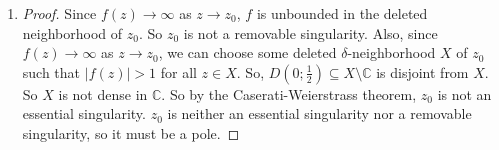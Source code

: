 \documentclass[11pt, letterpaper]{article}
\begin{document}
\begin{enumerate}
\begin{proof}
    Since $\ln z$ is analytic on this domain, $f(z)$ is analytic on this domain. Note that when $z \in \mathbb R$, the second factor is $1$, so $f(x) = x^x$ is real-valued on $\mathbb R$. We have

    $$
    f(i) = \exp(i \ln 1 + i^2 \pi/2) = \exp(-\pi/2) = \frac{1}{e^{\pi/2}}
    $$

    and

    $$
    f(-i) = \exp(-i \ln 1 + i^2 \pi/2) = \exp(-\pi/2) = \frac{1}{e^{\pi/2}}
    $$
  \end{proof}

  \item \begin{proof}
    Since $f(z) \to \infty$ as $z \to z_0$, $f$ is unbounded in the deleted neighborhood of $z_0$. So $z_0$ is not a removable singularity. Also, since $f(z) \to \infty$ as $z \to z_0$, we can choose some deleted $\delta$-neighborhood $X$ of $z_0$ such that $\vert f(z) \vert > 1$ for all $z \in X$. So, $D(0; \frac{1}{2}) \subseteq X \setminus \mathbb C$ is disjoint from $X$. So $X$ is not dense in $\mathbb C$. So by the Caserati-Weierstrass theorem, $z_0$ is not an essential singularity. $z_0$ is neither an essential singularity nor a removable singularity, so it must be a pole.
  \end{proof}

\end{enumerate}
\end{document}
